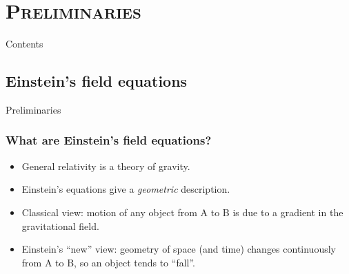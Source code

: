 \documentclass[xcolor=x11names,compress]{beamer}
\renewcommand{\(}{\begin{columns}}
\renewcommand{\)}{\end{columns}}
\newcommand{\<}[1]{\begin{column}{#1}}
\renewcommand{\>}{\end{column}}
\begin{document}

\section{\scshape Preliminaries}
\begin{frame}{Contents}
\tableofcontents
\end{frame}

\subsection{Einstein's field equations}
\begin{frame}{Preliminaries}
\frametitle{What are Einstein's field equations?}
\begin{itemize}
\item General relativity is a theory of gravity.
\item Einstein's equations give a {\it geometric} description.
\item Classical view: motion of any object from A to B is 
due to a gradient in the gravitational field.
\item Einstein's ``new'' view: geometry of space (and time) 
changes continuously from A to B, so an object tends to ``fall''.
\end{itemize}
\end{frame}
\end{document}
